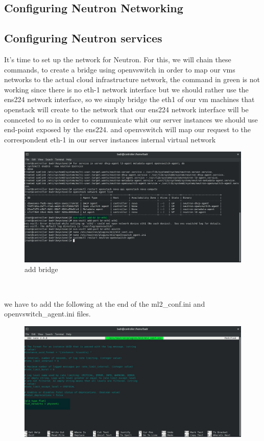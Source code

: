 \begin{spacing}{1.2}
\section{Configuring Neutron Networking}
\subsection{Configuring Neutron services}
\par It's time to set up the network for Neutron. For this, we will chain these commands, to create a bridge using openvswitch in order to map our vms networks to the actual cloud infrastructure network, the command in green is not working since there is no eth-1 network interface but we should rather use the ens224 network interface, so we simply bridge the eth1 of our vm machines that openstack will create to the network that our ens224 network interface will be connceted to so in order to communicate whit our server instances we should use end-point exposed by the ens224. and openvswitch will map our request to the correspondent eth-1 in our server instances internal virtual network
\\
\begin{figure}[!htb] 
\begin{center} 
\includegraphics[width=1\linewidth]{Cloud/Configuring Neutron Networking/add bridge} 
\end{center} 
\caption{add bridge} 
\end{figure} 
\FloatBarrier
\\
\par we have to add the following at the end of the ml2_conf.ini and openvswitch_agent.ini files.
\\
\begin{figure}[!htb] 
\begin{center} 
\includegraphics[width=1\linewidth]{Cloud/Configuring Neutron Networking/add to the end of ml2_conf} 

\end{center}
\end{figure}
\end{spacing}
